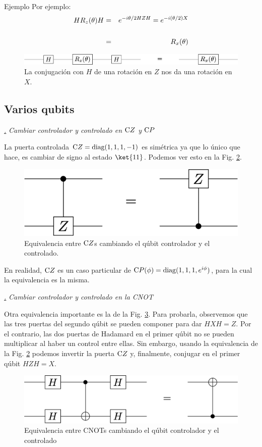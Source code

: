 \documentclass[a4paper,11pt]{book} %
\numberwithin{equation}{chapter}
\newcommand{\cg}[1]{{\rm C}#1}
\def\subsubiContadorIt{\par\addtocounter{subsubsection}{1}\underline{\it\thesubsubsection.}\hskip0.5cm \setcounter{subsubsubsectionIt}{0}}
\newcommand{\SubsubiIt}[1]{
		\subsubiContadorIt \textit{#1}
	}
\newcounter{subsubsubsectionIt}[subsubsection]
\begin{document}
	\begin{mybox_green}{Ejemplo}
	Por ejemplo:
	\begin{eqnarray*}
	H R_z(\theta) H &=& e^{-i \theta/2 HZH} =  e^{-i (\theta/2) X} \\ \rule{0mm}{8mm}
	&=& R_x(\theta)
	\end{eqnarray*}
		\begin{figure}[H]
		\centering 
		\includegraphics[width=0.70\linewidth]{Figuras/Fig_elementos_HRzHconjugation.png}
		\caption{La conjugación con $H$ de una rotación en $Z$ nos da una rotación en $X$.}
		\label{Fig_elementos_HRzHconjugation}
		\end{figure}
	\end{mybox_green}
	

        \subsection{Varios qubits}

			\SubsubiIt{Cambiar controlador y controlado en $\cg{Z}$ y $\cg{P}$}

La puerta  controlada $\cg{Z} =  {\rm diag}(1,1,1,-1)$   es simétrica ya que lo único que hace, es cambiar de signo al estado $\ket{11}$. Podemos ver esto en la Fig. \ref{Fig_elementos_Equiv_Z}.
	\begin{figure}[H]
	\centering 
	\includegraphics[width=0.35\linewidth]{Figuras/Fig_elementos_Equiv_Z.png}
	\caption{Equivalencia entre $\cg{Z}$s cambiando el qúbit controlador y el controlado.}
	\label{Fig_elementos_Equiv_Z}
	\end{figure}
 En realidad, $\cg{Z}$ es un caso particular de   $\cg{P(\phi)} = {\rm diag} (1,1,1, e^{i\phi})$, para la cual la equivalencia es la misma. 


			\SubsubiIt{Cambiar controlador y controlado en la CNOT} 
			
Otra equivalencia importante es la de la Fig. \ref{Fig_elementos_Equiv_HH}. Para probarla, observemos que las tres puertas del segundo qúbit se pueden componer para dar $HXH=Z$. Por el contrario, las dos puertas de Hadamard en el primer qúbit no se pueden multiplicar al haber un control entre ellas. Sin embargo, usando la  equivalencia de la Fig. \ref{Fig_elementos_Equiv_Z} podemos invertir la puerta $\cg{Z}$ y, finalmente, conjugar en el primer qúbit $HZH=X$.
	\begin{figure}[H]
	\centering 
	\includegraphics[width=0.45\linewidth]{Figuras/Fig_elementos_Equiv_HH.png}
	\caption{Equivalencia entre CNOTs cambiando el qúbit controlador y el controlado}
	\label{Fig_elementos_Equiv_HH}
	\end{figure}
\end{document}
